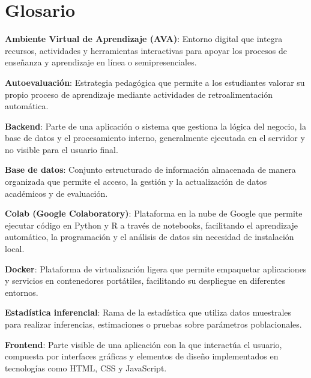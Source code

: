 \documentclass[letter,oneside,12pt,spanish]{report}
\begin{document}
\parskip=12pt
\tableofcontents                    

\newpage

\listoffigures 
\listoftables                        %
\newpage

\chapter*{Glosario}

\begin{description}

\item \textbf{Ambiente Virtual de Aprendizaje (AVA)}: Entorno digital que integra recursos, actividades y herramientas interactivas para apoyar los procesos de enseñanza y aprendizaje en línea o semipresenciales.
\item \textbf{Autoevaluación}: Estrategia pedagógica que permite a los estudiantes valorar su propio proceso de aprendizaje mediante actividades de retroalimentación automática.
\item \textbf{Backend}: Parte de una aplicación o sistema que gestiona la lógica del negocio, la base de datos y el procesamiento interno, generalmente ejecutada en el servidor y no visible para el usuario final.
\item \textbf{Base de datos}: Conjunto estructurado de información almacenada de manera organizada que permite el acceso, la gestión y la actualización de datos académicos y de evaluación.
\item \textbf{Colab (Google Colaboratory)}: Plataforma en la nube de Google que permite ejecutar código en Python y R a través de notebooks, facilitando el aprendizaje automático, la programación y el análisis de datos sin necesidad de instalación local.
\item \textbf{Docker}: Plataforma de virtualización ligera que permite empaquetar aplicaciones y servicios en contenedores portátiles, facilitando su despliegue en diferentes entornos.
\item \textbf{Estadística inferencial}: Rama de la estadística que utiliza datos muestrales para realizar inferencias, estimaciones o pruebas sobre parámetros poblacionales.
\item \textbf{Frontend}: Parte visible de una aplicación con la que interactúa el usuario, compuesta por interfaces gráficas y elementos de diseño implementados en tecnologías como HTML, CSS y JavaScript.

\end{description}
\end{document}
